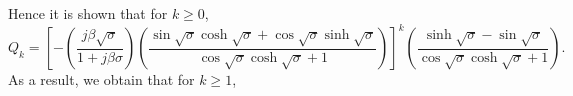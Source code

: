 \documentclass{article}
\begin{document}
Hence it is shown that for $k \geq 0$,
\begin{equation}
    Q_{k} = \left[- \left( \frac{j \beta \sqrt{\sigma }}{1+j \beta \sigma } \right) \left( \frac{ \sin\sqrt{\sigma} \cosh\sqrt{\sigma} + \cos\sqrt{\sigma} \sinh\sqrt{\sigma} }{ \cos\sqrt{\sigma }\cosh\sqrt{\sigma }+1 } \right)  \right]^k \left( \frac{\sinh\sqrt{\sigma }-\sin\sqrt{\sigma }}{\cos\sqrt{\sigma } \cosh\sqrt{\sigma }+1} \right).
\end{equation}
As a result, we obtain that for $k \geq 1$,
\footnotesize
\end{document}
